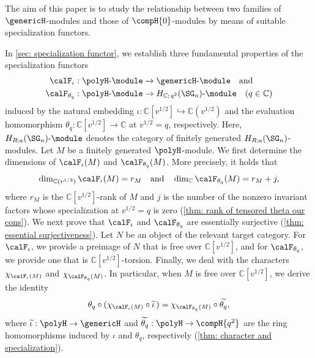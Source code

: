 \documentclass[12pt, reqno]{amsart}
\theoremstyle{plain}
\theoremstyle{definition}
\numberwithin{equation}{section}
\numberwithin{figure}{section}
\numberwithin{table}{section}
\def\C{\mathbb C}
\begin{document}
The aim of this paper is to study the relationship between two families of $\genericH$-modules and those of $\compH{0}$-modules by means of suitable specialization functors.

In \cref{sec: specialization functor}, we  establish three fundamental properties of the specialization functors 
\begin{align*}
\calF_{\iota}&:\polyH\text{-}\module\to \genericH\text{-}\module\quad\text{and}\\
\calF_{\theta_q}&:\polyH\text{-}\module
\to H_{\C;\,q^2}(\SG_n)\text{-}\module \quad(q \in \C)
\end{align*}
induced by the natural embedding
$\iota:\C[v^{1/2}]\hookrightarrow\C(v^{1/2})$ and the evaluation homomorphism
$\theta_q:\C[v^{1/2}]\to\C$ at $v^{1/2} = q$, respectively.
Here, $H_{R;a}(\SG_n)\text{-}\module$ denotes the category of finitely generated $H_{R;a}(\SG_n)$-modules.
Let $M$ be a  finitely generated $\polyH$-module. 
We first determine the dimensions of $\calF_\iota(M)$ and $\calF_{\theta_q}(M)$.
More precisely, it holds that 
\[
\dim_{\C(v^{1/2})} \calF_\iota(M) = r_M
\quad \text{and} \quad
\dim_{\C} \calF_{\theta_q}(M) = r_M + j,
\]
where $r_M$ is the $\C[v^{1/2}]$-rank of $M$ and $j$ is the number of the nonzero invariant factors
whose specialization at $v^{1/2} = q$ is zero (\cref{thm: rank of tensored theta our cons}).
We next prove that $\calF_\iota$ and $\calF_{\theta_q}$ are essentially surjective (\cref{thm: essential surjectiveness}). 
Let $N$ be an object of the relevant target category. 
For $\calF_\iota$, we provide a preimage of $N$ that is free over $\C[v^{1/2}]$, and 
for $\calF_{\theta_q}$, we provide one that is $\C[v^{1/2}]$-torsion.
Finally, we deal with the characters $\chi_{\calF_\iota(M)}$ and $\chi_{\calF_{\theta_q}(M)}$.
In particular,
when $M$ is free over $\C[v^{1/2}]$,
we derive the identity
\[
\theta_q \circ (\chi_{\calF_\iota(M)} \circ \widetilde{\iota}\,) = \chi_{\calF_{\theta_q}(M)} \circ \widetilde{\theta_q},
\]
where $\widetilde{\iota}: \polyH \to \genericH$ and $\widetilde{\theta_q}: \polyH \to \compH{q^2}$ are the ring homomorphisms induced by $\iota$ and $\theta_q$, respectively
(\cref{thm: character and specialization}).
\end{document}

